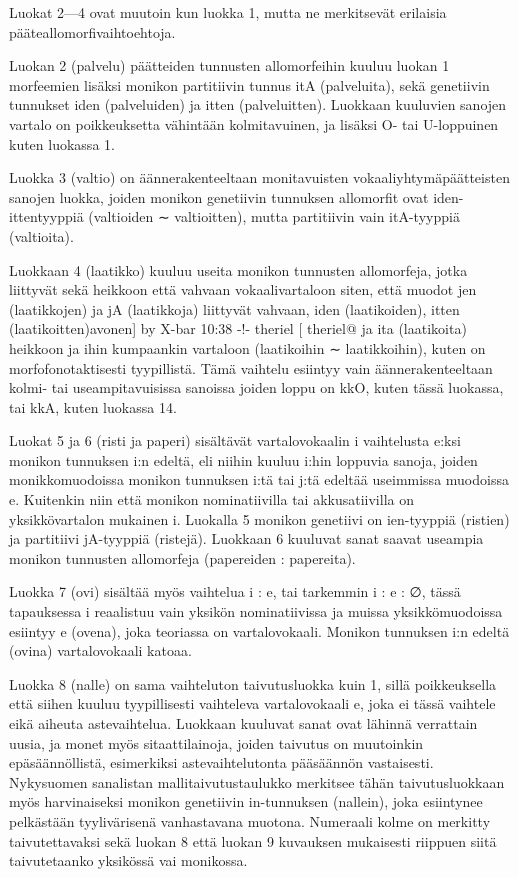 \documentclass[free]{flammie}
\begin{document}
Luokat 2—4 ovat muutoin kun luokka 1, mutta ne merkitsevät erilaisia pääteallomorfivaihtoehtoja.

Luokan 2 (palvelu) päätteiden tunnusten allomorfeihin kuuluu luokan 1 morfeemien lisäksi monikon partitiivin tunnus itA (palveluita), sekä genetiivin tunnukset
iden (palveluiden) ja itten (palveluitten). Luokkaan kuuluvien sanojen vartalo on
poikkeuksetta vähintään kolmitavuinen, ja lisäksi O- tai U-loppuinen kuten luokassa 1.

Luokka 3 (valtio) on äännerakenteeltaan monitavuisten vokaaliyhtymäpäätteisten
sanojen luokka, joiden monikon genetiivin tunnuksen allomorfit ovat iden-ittentyyppiä (valtioiden ∼ valtioitten), mutta partitiivin vain itA-tyyppiä (valtioita).

Luokkaan 4 (laatikko) kuuluu useita monikon tunnusten allomorfeja, jotka liittyvät sekä heikkoon että vahvaan vokaalivartaloon siten, että muodot jen (laatikkojen) ja jA (laatikkoja) liittyvät vahvaan, iden (laatikoiden), itten (laatikoitten)avonen] by X-bar 10:38 -!- theriel [ theriel@ ja ita (laatikoita) heikkoon ja
ihin kumpaankin vartaloon (laatikoihin ∼ laatikkoihin), kuten on morfofonotaktisesti tyypillistä. Tämä vaihtelu esiintyy vain äännerakenteeltaan kolmi- tai useampitavuisissa sanoissa joiden loppu on kkO, kuten tässä luokassa, tai kkA, kuten
luokassa 14.

Luokat 5 ja 6 (risti ja paperi) sisältävät vartalovokaalin i vaihtelusta e:ksi monikon tunnuksen i:n edeltä, eli niihin kuuluu i:hin loppuvia sanoja, joiden monikkomuodoissa monikon tunnuksen i:tä tai j:tä edeltää useimmissa muodoissa e.
Kuitenkin niin että monikon nominatiivilla tai akkusatiivilla on yksikkövartalon
mukainen i.
Luokalla 5 monikon genetiivi on ien-tyyppiä (ristien) ja partitiivi jA-tyyppiä (ristejä). Luokkaan 6 kuuluvat sanat saavat useampia monikon tunnusten allomorfeja
(papereiden : papereita).

Luokka 7 (ovi) sisältää myös vaihtelua i : e, tai tarkemmin i : e : ∅, tässä tapauksessa i reaalistuu vain yksikön nominatiivissa ja muissa yksikkömuodoissa
esiintyy e (ovena), joka teoriassa on vartalovokaali. Monikon tunnuksen i:n edeltä
(ovina) vartalovokaali katoaa.

Luokka 8 (nalle) on sama vaihteluton taivutusluokka kuin 1, sillä poikkeuksella että siihen kuuluu tyypillisesti vaihteleva vartalovokaali e, joka ei tässä vaihtele eikä aiheuta astevaihtelua. Luokkaan kuuluvat sanat ovat lähinnä verrattain
uusia, ja monet myös sitaattilainoja, joiden taivutus on muutoinkin epäsäännöllistä, esimerkiksi astevaihtelutonta pääsäännön vastaisesti. Nykysuomen sanalistan
mallitaivutustaulukko merkitsee tähän taivutusluokkaan myös harvinaiseksi monikon genetiivin in-tunnuksen (nallein), joka esiintynee pelkästään tyylivärisenä
vanhastavana muotona.
Numeraali kolme on merkitty taivutettavaksi sekä luokan 8 että luokan 9 kuvauksen mukaisesti riippuen siitä taivutetaanko yksikössä vai monikossa.
\end{document}
